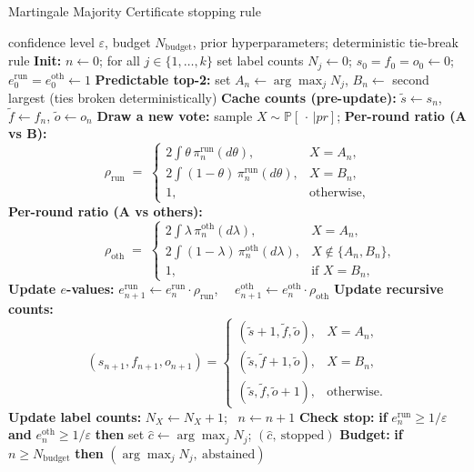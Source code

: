 \begin{algorithm}[ht]
\small{
\caption{Martingale Majority Certificate stopping rule}
\label{alg:stopping_rule}
\begin{algorithmic}[1]
\Require confidence level $\varepsilon$, budget $N_{\text{budget}}$, prior hyperparameters; deterministic tie-break rule
\State \textbf{Init:} $n\gets 0$; for all $j\in\{1,\dots,k\}$ set label counts $N_j\gets 0$; $s_0=f_0=o_0\gets 0$; $e^{\mathrm{run}}_0=e^{\mathrm{oth}}_0\gets 1$
  \State \textbf{Predictable top-2:} set $A_n\gets\arg\max_j N_j$, $B_n\gets$ second largest (ties broken deterministically)
  \State \textbf{Cache counts (pre-update):} $\tilde s\gets s_n$, $\tilde f\gets f_n$, $\tilde o\gets o_n$
  \State \textbf{Draw a new vote:} sample $X\sim\mathbb P[\,\cdot\,| pr]$; 
  \State \textbf{Per-round ratio (A vs B):}
  \[
  \rho_{\mathrm{run}} \;=\;
  \scriptstyle\begin{cases}
 2\!\displaystyle\int \theta\,\pi^{\mathrm{run}}_n(d\theta), & X = A_{n},\\[1mm]
 2\!\displaystyle\int (1-\theta)\,\pi^{\mathrm{run}}_n(d\theta), & X = B_{n},\\[1mm]
1, & \text{otherwise,}
\end{cases}
  \]
  \State \textbf{Per-round ratio (A vs others):}
  \[
  \hspace{26pt}\rho_{\mathrm{oth}} \;=\;
\scriptstyle\begin{cases}
2\!\displaystyle\int \lambda\,\pi^{\mathrm{oth}}_n(d\lambda), & X = A_{n},\\[1mm]
 2\!\displaystyle\int (1-\lambda)\,\pi^{\mathrm{oth}}_n(d\lambda), & X \notin \{A_{n},B_{n}\},\\[1mm]
1, & \text{if } X = B_{n},
\end{cases}
  \]
  \State \textbf{Update $e$-values:} $e^{\mathrm{run}}_{n+1}\gets e^{\mathrm{run}}_{n}\cdot \rho_{\mathrm{run}}$, \ \ $e^{\mathrm{oth}}_{n+1}\gets e^{\mathrm{oth}}_{n}\cdot \rho_{\mathrm{oth}}$
  \State \textbf{Update recursive counts:}
  \[
  (s_{n+1},f_{n+1},o_{n+1})=
  \begin{cases}
    (\tilde s+1,\tilde f,\tilde o), & X=A_n,\\
    (\tilde s,\tilde f+1,\tilde o), & X=B_n,\\
    (\tilde s,\tilde f,\tilde o+1), & \text{otherwise.}
  \end{cases}
  \]
  \State \textbf{Update label counts:} $N_X\gets N_X+1$; \ $n\gets n+1$
  \State \textbf{Check stop:} \textbf{if} $e^{\mathrm{run}}_{n}\ge 1/\varepsilon$ \textbf{and} $e^{\mathrm{oth}}_{n}\ge 1/\varepsilon$ \textbf{then}
     \State \hspace{1.5em} set $\hat c\gets \arg\max_j N_j$; \Return $(\hat c,\ \text{stopped})$
  \State \textbf{Budget:} \textbf{if} $n\ge N_{\text{budget}}$ \textbf{then} \Return $(\arg\max_j N_j,\ \text{abstained})$
\EndWhile
\end{algorithmic}}
\normalsize
\end{algorithm}

